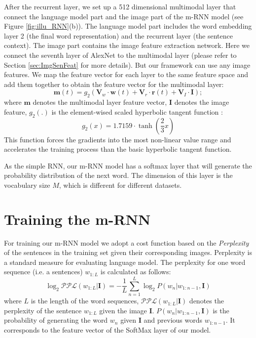 After the recurrent layer, we set up a 512 dimensional multimodal layer that connect the language model part and the image part of the m-RNN model (see Figure \ref{fig:illu_RNN}(b)).
The language model part includes the word embedding layer 2 (the final word representation) and the recurrent layer (the sentence context).
The image part contains the image feature extraction network.
Here we connect the seventh layer of AlexNet \cite{krizhevsky2012imagenet} to the multimodal layer (please refer to Section \ref{sec:ImgSenFeat} for more details).
But our framework can use any image features.
We map the feature vector for each layer to the same feature space and add them together to obtain the feature vector for the multimodal layer:
\begin{equation}
\mathbf{m}(t)=g_2(\mathbf{V}_w \cdot \mathbf{w}(t) + \mathbf{V}_r \cdot \mathbf{r}(t) + \mathbf{V}_I \cdot \mathbf{I});
\end{equation}
where $\mathbf{m}$ denotes the multimodal layer feature vector, $\mathbf{I}$ denotes the image feature, $g_2(.)$ is the element-wised scaled hyperbolic tangent function \cite{lecun2012efficient}:
\begin{equation}
g_2(x) = 1.7159 \cdot \tanh( \frac{2}{3} x)
\end{equation}
This function forces the gradients into the most non-linear value range and accelerates the training process than the basic hyperbolic tangent function.


As the simple RNN, our m-RNN model has a softmax layer that will generate the probability distribution of the next word.
The dimension of this layer is the vocabulary size $M$, which is different for different datasets.

\section{Training the m-RNN}
\label{sec:trainCost}
For training our m-RNN model we adopt a cost function based on the \emph{Perplexity} of the sentences in the training set given their corresponding images.
Perplexity is a standard measure for evaluating language model.
The perplexity for one word sequence (i.e. a sentences) $w_{1:L}$ is calculated as follows:
\begin{equation}
\log_2 \mathcal{PPL}(w_{1:L}|\mathbf{I}) = -\frac{1}{L} \sum_{n=1}^{L} \log_2 P(w_n|w_{1:n-1},\mathbf{I})
\end{equation}
where $L$ is the length of the word sequences, $\mathcal{PPL}(w_{1:L}|\mathbf{I})$ denotes the perplexity of the sentence $w_{1:L}$ given the image $\mathbf{I}$.
$P(w_n|w_{1:n-1},\mathbf{I})$ is the probability of generating the word $w_n$ given $\mathbf{I}$ and previous words $w_{1:n-1}$.
It corresponds to the feature vector of the SoftMax layer of our model.

